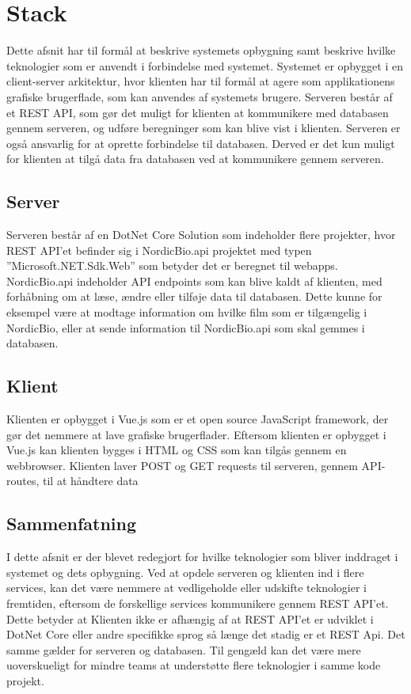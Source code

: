 \section{Stack}
Dette afsnit har til formål at beskrive systemets opbygning samt beskrive hvilke teknologier som er anvendt i forbindelse med systemet. 
Systemet er opbygget i en client-server arkitektur, hvor klienten har til formål at agere som applikationens grafiske 
brugerflade, som kan anvendes af systemets brugere. Serveren består af et REST API, som gør det muligt for klienten 
at kommunikere med databasen gennem serveren, og udføre beregninger som kan blive vist i klienten. Serveren er også 
ansvarlig for at oprette forbindelse til databasen. Derved er det kun muligt for klienten at tilgå data fra databasen 
ved at kommunikere gennem serveren.\\

\subsection{Server}
Serveren består af en DotNet Core Solution som indeholder flere projekter, hvor REST API’et befinder sig i NordicBio.api 
projektet med typen ”Microsoft.NET.Sdk.Web” som betyder det er beregnet til webapps. 
NordicBio.api indeholder API endpoints som kan blive kaldt af klienten, med forhåbning om at læse, ændre eller tilføje data til databasen. 
Dette kunne for eksempel være at modtage information om hvilke film som er tilgængelig i NordicBio, eller at sende information til 
NordicBio.api som skal gemmes i databasen.\\

\subsection{Klient}
Klienten er opbygget i Vue.js som er et open source JavaScript framework, der gør det nemmere at lave grafiske 
brugerflader. Eftersom klienten er opbygget i Vue.js kan klienten bygges i HTML og CSS som kan tilgås 
gennem en webbrowser. Klienten laver POST og GET requests til serveren, gennem API-routes, til at håndtere data\\

\subsection{Sammenfatning}
I dette afsnit er der blevet redegjort for hvilke teknologier som bliver inddraget i systemet og dets opbygning. 
Ved at opdele serveren og klienten ind i flere services, kan det være nemmere at vedligeholde eller udskifte teknologier 
i fremtiden, eftersom de forskellige services kommunikere gennem REST API’et. 
Dette betyder at Klienten ikke er afhængig af at REST API’et er udviklet i DotNet Core eller andre specifikke sprog så 
længe det stadig er et REST Api. Det samme gælder for serveren og databasen. Til gengæld kan det være mere uoverskueligt 
for mindre teams at understøtte flere teknologier i samme kode projekt. 


